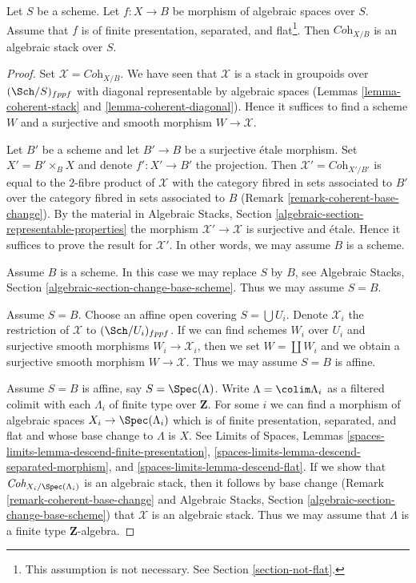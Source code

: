 \begin{theorem}
\label{theorem-coherent-algebraic}
Let $S$ be a scheme. Let $f : X \to B$ be morphism of algebraic spaces
over $S$. Assume that $f$ is of finite presentation, separated, and
flat\footnote{This assumption is not necessary. See
Section \ref{section-not-flat}.}. Then $\textit{Coh}_{X/B}$ is
an algebraic stack over $S$.
\end{theorem}

\begin{proof}
Set $\mathcal{X} = \textit{Coh}_{X/B}$. We have seen that $\mathcal{X}$
is a stack in groupoids over $(\Sch/S)_{fppf}$ with diagonal representable
by algebraic spaces
(Lemmas \ref{lemma-coherent-stack} and \ref{lemma-coherent-diagonal}).
Hence it suffices to find a scheme $W$ and a surjective and smooth
morphism $W \to \mathcal{X}$.

\medskip\noindent
Let $B'$ be a scheme and let $B' \to B$ be a surjective \'etale morphism.
Set $X' = B' \times_B X$ and denote $f' : X' \to B'$ the projection.
Then $\mathcal{X}' = \textit{Coh}_{X'/B'}$ is equal to the $2$-fibre
product of $\mathcal{X}$ with the category fibred in sets
associated to $B'$ over the category fibred in sets associated to $B$
(Remark \ref{remark-coherent-base-change}). By the material in
Algebraic Stacks, Section \ref{algebraic-section-representable-properties}
the morphism $\mathcal{X}' \to \mathcal{X}$ is surjective and \'etale.
Hence it suffices to prove the result for $\mathcal{X}'$.
In other words, we may assume $B$ is a scheme.

\medskip\noindent
Assume $B$ is a scheme. In this case we may replace $S$ by $B$, see
Algebraic Stacks, Section \ref{algebraic-section-change-base-scheme}.
Thus we may assume $S = B$.

\medskip\noindent
Assume $S = B$. Choose an affine open covering $S = \bigcup U_i$.
Denote $\mathcal{X}_i$ the restriction of $\mathcal{X}$ to
$(\Sch/U_i)_{fppf}$. If we can find schemes $W_i$ over $U_i$ and
surjective smooth morphisms $W_i \to \mathcal{X}_i$, then we
set $W = \coprod W_i$ and we obtain a surjective smooth morphism
$W \to \mathcal{X}$. Thus we may assume $S = B$ is affine.

\medskip\noindent
Assume $S = B$ is affine, say $S = \Spec(\Lambda)$.
Write $\Lambda = \colim \Lambda_i$ as a filtered colimit with each $\Lambda_i$
of finite type over $\mathbf{Z}$. For some $i$ we can find
a morphism of algebraic spaces $X_i \to \Spec(\Lambda_i)$
which is of finite presentation, separated, and flat and whose base change
to $\Lambda$ is $X$. See
Limits of Spaces, Lemmas
\ref{spaces-limits-lemma-descend-finite-presentation},
\ref{spaces-limits-lemma-descend-separated-morphism}, and
\ref{spaces-limits-lemma-descend-flat}.
If we show that $\textit{Coh}_{X_i/\Spec(\Lambda_i)}$ is an
algebraic stack, then it follows by base change
(Remark \ref{remark-coherent-base-change} and
Algebraic Stacks, Section \ref{algebraic-section-change-base-scheme})
that $\mathcal{X}$ is an algebraic stack.
Thus we may assume that $\Lambda$ is a finite type $\mathbf{Z}$-algebra.


\end{proof}
